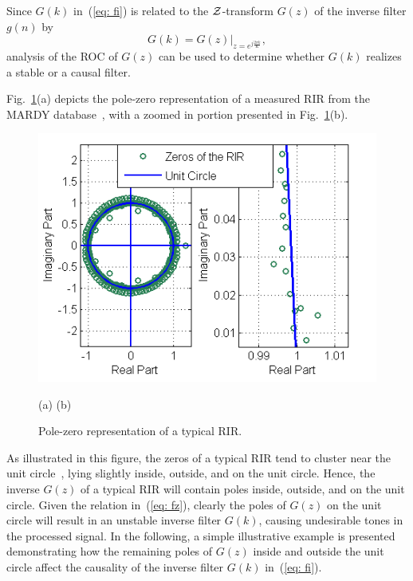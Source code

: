 \documentclass{article}
\begin{document}
Since $G(k)$ in~(\ref{eq: fi}) is related to the $\cal{Z}$-transform $G(z)$ of the inverse filter $g(n)$ by
\begin{equation}
\label{eq: fz}
G(k) = G(z) \Big |_{z = e^{j\frac{2 \pi k}{K}}},
\end{equation}
analysis of the ROC of $G(z)$ can be used to determine whether $G(k)$ realizes a stable or a causal filter. 

Fig.~\ref{fig: poleh}(a) depicts the pole-zero representation of a measured RIR from the MARDY database~\cite{Wen_IWAENC_2006}, with a zoomed in portion presented in Fig.~\ref{fig: poleh}(b).
\begin{figure}[b!]
  
  \hspace{0.6cm} \includegraphics[scale=0.65]{plots/bode_plot}

  \hspace{2.7cm} (a) \hspace{3.4cm} (b)

  \caption{Pole-zero representation of a typical RIR.}
  \label{fig: poleh}
\end{figure}
As illustrated in this figure, the zeros of a typical RIR tend to cluster near the unit circle~\cite{Hughes_2008}, lying slightly inside, outside, and on the unit circle.
Hence, the inverse $G(z)$ of a typical RIR will contain poles inside, outside, and on the unit circle.
Given the relation in~(\ref{eq: fz}), clearly the poles of $G(z)$ on the unit circle will result in an unstable inverse filter $G(k)$, causing undesirable tones in the processed signal.
In the following, a simple illustrative example is presented demonstrating how the remaining poles of $G(z)$ inside and outside the unit circle affect the causality of the inverse filter $G(k)$ in~(\ref{eq: fi}).
\end{document}
